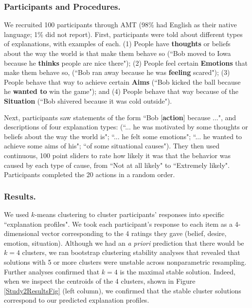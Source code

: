 \documentclass[10pt,letterpaper]{article}
\newcommand{\ndg}[1]{\textcolor{Green}{[ndg: #1]}}
\begin{document}
\subsubsection{Participants and Procedures.} 
We recruited 100 participants through AMT (98\% had English as their native language; 1\% did not report).
First, participants were told about different types of explanations, with examples of each. (1) People have \textbf{thoughts} or beliefs about the way the world is that make them behave so (``Bob moved to Iowa because he \textbf{thinks} people are nice there"); 
(2) People feel certain \textbf{Emotions} that make them behave so, (``Bob ran away because he was \textbf{feeling} scared"); 
(3) People behave that way to achieve certain \textbf{Aims} (``Bob kicked the ball because he \textbf{wanted to} win the game"); and 
(4) People behave that way because of the \textbf{Situation} (``Bob shivered because it was cold outside").

Next, participants saw statements of the form ``Bob [\textbf{action}] because ...", and descriptions of four explanation types: (``... he was motivated by some thoughts or beliefs about the way the world is"; ``... he felt some emotions"; ``... he wanted to achieve some aims of his"; ``of some situational causes"). They then used continuous, 100 point sliders to rate how likely it was that the behavior was caused by each type of cause, from ``Not at all likely" to ``Extremely likely". Participants completed the 20 actions in a random order.


\subsubsection{Results.} 
We used $k$-means clustering to cluster participants' responses into specific ``explanation profiles". We took each participant's response to each item as a 4-dimensional vector corresponding to the 4 ratings they gave (belief, desire, emotion, situation). Although we had an \textit{a priori} prediction that there would be $k=4$ clusters, we ran bootstrap clustering stability analyses \cite{Hennig2007} that revealed that solutions with 5 or more clusters were unstable across nonparametric resampling. Further analyses confirmed that $k=4$ is the maximal stable solution. Indeed, when we inspect the centroids of the 4 clusters, shown in Figure \ref{Study2ResultsFig} (left column), we confirmed that the stable cluster solutions correspond to our predicted explanation profiles.
\end{document}
